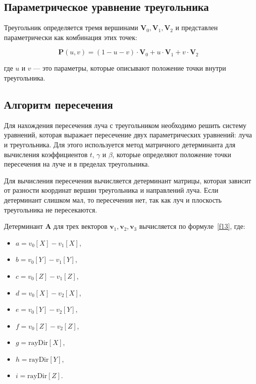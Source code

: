 \subsection{Параметрическое уравнение треугольника}

Треугольник определяется тремя вершинами \( \mathbf{V}_0, \mathbf{V}_1, \mathbf{V}_2 \) и представлен параметрически как комбинация этих точек:

\begin{equation}
\mathbf{P}(u, v) = (1 - u - v) \cdot \mathbf{V}_0 + u \cdot \mathbf{V}_1 + v \cdot \mathbf{V}_2
\end{equation}

где \(u\) и \(v\) — это параметры, которые описывают положение точки внутри треугольника.

\subsection{Алгоритм пересечения}

Для нахождения пересечения луча с треугольником необходимо решить систему уравнений, которая выражает пересечение двух параметрических уравнений: луча и треугольника. Для этого используется метод матричного детерминанта для вычисления коэффициентов \( t \), \( \gamma \) и \( \beta \), которые определяют положение точки пересечения на луче и в пределах треугольника.

Для вычисления пересечения вычисляется детерминант матрицы, которая зависит от разности координат вершин треугольника и направлений луча. Если детерминант слишком мал, то пересечения нет, так как луч и плоскость треугольника не пересекаются.

Детерминант \(\mathbf{A}\) для трех векторов \(\mathbf{v}_1, \mathbf{v}_2, \mathbf{v}_3\) вычисляется по формуле~\ref{f13}, где:
\begin{itemize}
    \item \(a = v_0[X] - v_1[X]\),
    \item \(b = v_0[Y] - v_1[Y]\),
    \item \(c = v_0[Z] - v_1[Z]\),
    \item \(d = v_0[X] - v_2[X]\),
    \item \(e = v_0[Y] - v_2[Y]\),
    \item \(f = v_0[Z] - v_2[Z]\),
    \item \(g = \text{rayDir}[X]\),
    \item \(h = \text{rayDir}[Y]\),
    \item \(i = \text{rayDir}[Z]\).
\end{itemize}

